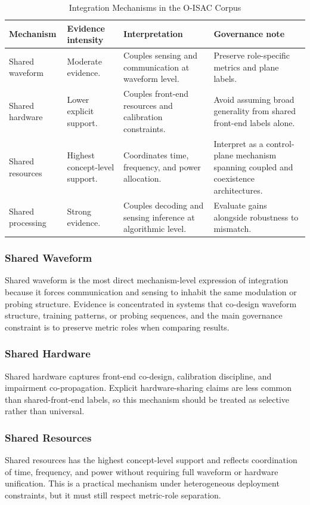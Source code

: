 \begin{table}[!t]
\caption{Integration Mechanisms in the O-ISAC Corpus}
\label{tab:integration-mechanisms}
\centering
\footnotesize
\setlength{\tabcolsep}{4pt}
\begin{tabularx}{\textwidth}{p{}p{}p{}X}
\toprule
\textbf{Mechanism} & \textbf{Evidence intensity} & \textbf{Interpretation} & \textbf{Governance note} \\
\midrule
Shared waveform & Moderate evidence. & Couples sensing and communication at waveform level. & Preserve role-specific metrics and plane labels. \\
Shared hardware & Lower explicit support. & Couples front-end resources and calibration constraints. & Avoid assuming broad generality from shared front-end labels alone. \\
Shared resources & Highest concept-level support. & Coordinates time, frequency, and power allocation. & Interpret as a control-plane mechanism spanning coupled and coexistence architectures. \\
Shared processing & Strong evidence. & Couples decoding and sensing inference at algorithmic level. & Evaluate gains alongside robustness to mismatch. \\
\bottomrule
\end{tabularx}
\end{table}

\subsubsection{Shared Waveform}
Shared waveform is the most direct mechanism-level expression of integration because it forces communication and sensing to inhabit the same modulation or probing structure. Evidence is concentrated in systems that co-design waveform structure, training patterns, or probing sequences, and the main governance constraint is to preserve metric roles when comparing results.

\subsubsection{Shared Hardware}
Shared hardware captures front-end co-design, calibration discipline, and impairment co-propagation. Explicit hardware-sharing claims are less common than shared-front-end labels, so this mechanism should be treated as selective rather than universal.

\subsubsection{Shared Resources}
Shared resources has the highest concept-level support and reflects coordination of time, frequency, and power without requiring full waveform or hardware unification. This is a practical mechanism under heterogeneous deployment constraints, but it must still respect metric-role separation.

